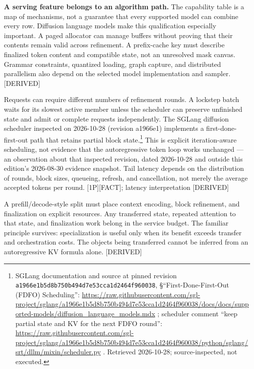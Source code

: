 \textbf{A serving feature belongs to an algorithm path.} The capability
table is a map of mechanisms, not a guarantee that every supported model
can combine every row. Diffusion language models make this qualification
especially important. A paged allocator can manage buffers without
proving that their contents remain valid across refinement. A
prefix-cache key must describe finalized token content and compatible
state, not an unresolved mask canvas. Grammar constraints, quantized
loading, graph capture, and distributed parallelism also depend on the
selected model implementation and sampler. \mbox{{[}DERIVED{]}}

Requests can require different numbers of refinement rounds. A lockstep
batch waits for its slowest active member unless the scheduler can
preserve unfinished state and admit or complete requests independently.
The SGLang diffusion scheduler inspected on 2026-10-28 (revision
a1966e1) implements a first-done-first-out path that retains partial
block state.\footnote{SGLang documentation and source at pinned revision
  \texttt{a1966e1b5d8b750b494d7e53cca1d2464f960038},
  §``First-Done-First-Out (FDFO) Scheduling'':
  \url{https://raw.githubusercontent.com/sgl-project/sglang/a1966e1b5d8b750b494d7e53cca1d2464f960038/docs/docs/supported-models/diffusion_language_models.mdx}
  ; scheduler comment ``keep partial state and KV for the next FDFO
  round'':
  \url{https://raw.githubusercontent.com/sgl-project/sglang/a1966e1b5d8b750b494d7e53cca1d2464f960038/python/sglang/srt/dllm/mixin/scheduler.py}
  . Retrieved 2026-10-28; source-inspected, not executed.} This is
explicit iteration-aware scheduling, not evidence that the
autoregressive token loop works unchanged --- an observation about that
inspected revision, dated 2026-10-28 and outside this edition's
2026-08-30 evidence snapshot. Tail latency depends on the distribution
of rounds, block sizes, queueing, refresh, and cancellation, not merely
the average accepted tokens per round. \mbox{{[}1P{]}}\hspace{0pt}\mbox{{[}FACT{]}}; latency
interpretation \mbox{{[}DERIVED{]}}

A prefill/decode-style split must place context encoding, block
refinement, and finalization on explicit resources. Any transferred
state, repeated attention to that state, and finalization work belong in
the service budget. The familiar principle survives: specialization is
useful only when its benefit exceeds transfer and orchestration costs.
The objects being transferred cannot be inferred from an autoregressive
KV formula alone. \mbox{{[}DERIVED{]}}

